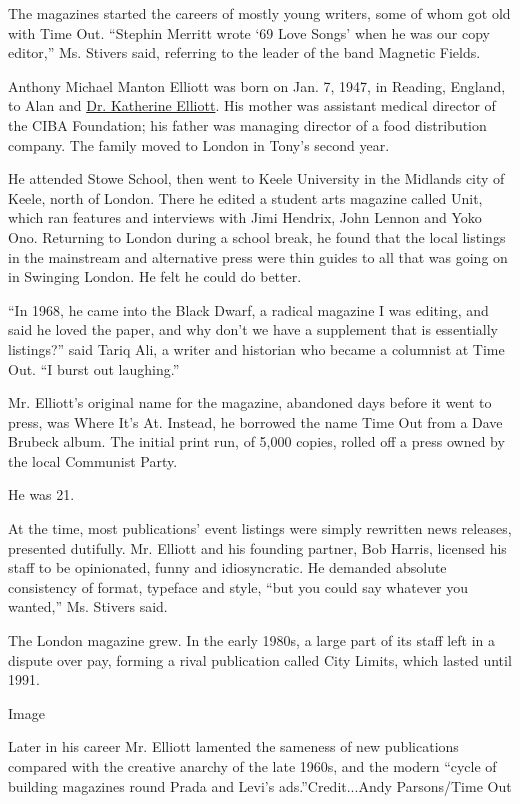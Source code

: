 The magazines started the careers of mostly young writers, some of whom
got old with Time Out. ``Stephin Merritt wrote `69 Love Songs' when he
was our copy editor,'' Ms. Stivers said, referring to the leader of the
band Magnetic Fields.

Anthony Michael Manton Elliott was born on Jan. 7, 1947, in Reading,
England, to Alan and
\href{https://www.nytimes.com/1994/11/17/obituaries/katherine-elliott-75-aided-health-of-poor.html}{Dr.
Katherine Elliott}. His mother was assistant medical director of the
CIBA Foundation; his father was managing director of a food distribution
company. The family moved to London in Tony's second year.

He attended Stowe School, then went to Keele University in the Midlands
city of Keele, north of London. There he edited a student arts magazine
called Unit, which ran features and interviews with Jimi Hendrix, John
Lennon and Yoko Ono. Returning to London during a school break, he found
that the local listings in the mainstream and alternative press were
thin guides to all that was going on in Swinging London. He felt he
could do better.

``In 1968, he came into the Black Dwarf, a radical magazine I was
editing, and said he loved the paper, and why don't we have a supplement
that is essentially listings?'' said Tariq Ali, a writer and historian
who became a columnist at Time Out. ``I burst out laughing.''

Mr. Elliott's original name for the magazine, abandoned days before it
went to press, was Where It's At. Instead, he borrowed the name Time Out
from a Dave Brubeck album. The initial print run, of 5,000 copies,
rolled off a press owned by the local Communist Party.

He was 21.

At the time, most publications' event listings were simply rewritten
news releases, presented dutifully. Mr. Elliott and his founding
partner, Bob Harris, licensed his staff to be opinionated, funny and
idiosyncratic. He demanded absolute consistency of format, typeface and
style, ``but you could say whatever you wanted,'' Ms. Stivers said.

The London magazine grew. In the early 1980s, a large part of its staff
left in a dispute over pay, forming a rival publication called City
Limits, which lasted until 1991.

Image

Later in his career Mr. Elliott lamented the sameness of new
publications compared with the creative anarchy of the late 1960s, and
the modern ``cycle of building magazines round Prada and Levi's
ads.''Credit...Andy Parsons/Time Out

